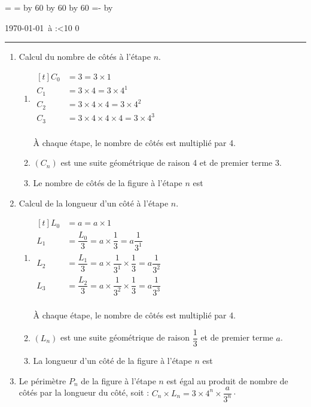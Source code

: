 \documentclass[a4paper,10pt]{article}
\renewcommand{\textbf}[1]{\begingroup\bfseries\mathversion{bold}#1\endgroup}
\begin{document}
\newcount\hh
\newcount\mm
\mm=\time
\hh=\time
\divide\hh by 60
\divide\mm by 60
\multiply\mm by 60
\mm=-\mm
\advance\mm by \time
\def\hhmm{\number\hh\string:\ifnum\mm<10 0\fi\number\mm}

\noindent \today\, à \hhmm

\vspace{2mm} \hrule \vspace{2mm}

\begin{enumerate}[label=\textbf{\arabic*)},leftmargin=*]
\item Calcul du nombre de côtés à l'étape $n$.
\begin{enumerate} [label=\alph*),leftmargin=0pt]
\item \parbox[t]{0.48\linewidth}{%
$\begin{aligned}[t]
C_0&=3=3\times 1\\
C_1&=3\times 4=3\times 4^1\\
C_2&=3\times 4 \times 4=3\times 4^2\\
C_3&=3\times 4 \times 4 \times 4=3\times 4^3\\
\end{aligned}$}
\hfil\vrule\hfil
\begin{minipage}[t][2cm][c]{0.48\linewidth}
À chaque étape, le nombre de côtés est multiplié par 4.
\end{minipage}
\item $(C_n)$ est une suite géométrique de raison 4 et de premier terme 3.
\item Le nombre de côtés de la figure à l'étape $n$ est \textcolor{blue}{}
\end{enumerate}
\item Calcul de la longueur d'un côté à l'étape $n$.
\begin{enumerate}[label=\alph*),leftmargin=0pt]
\item \parbox[t]{0.48\linewidth}{%
$
\begin{aligned}[t]
L_0&=a=a\times 1\\
L_1&=\dfrac{L_0}{3}=a\times \dfrac{1}{3}=a\dfrac{1}{3^1}\\
L_2&=\dfrac{L_1}{3}=a\times \dfrac{1}{3^1}\times \dfrac{1}{3}=a\dfrac{1}{3^2}\\
L_3&=\dfrac{L_2}{3}=a\times \dfrac{1}{3^2}\times \dfrac{1}{3}=a\dfrac{1}{3^3}\\
\end{aligned}
$}
\hfil\vrule\hfil
\parbox{0.48\linewidth}{%
À chaque étape, le nombre de côtés est multiplié par 4.
}
\item $(L_n)$ est une suite géométrique de raison $\dfrac{1}{3}$ et de premier terme $a$.
\item La longueur d'un côté de la figure à l'étape $n$ est \textcolor{blue}{ }
\end{enumerate}
\item Le périmètre $P_n$ de la figure à l'étape $n$  est égal au produit de nombre de côtés par la longueur du côté, soit : $C_n\times L_n=3\times 4^n\times \dfrac{a}{3^n}\cdot$ 
\textcolor{blue}{ }
\end{enumerate}
\end{document}
